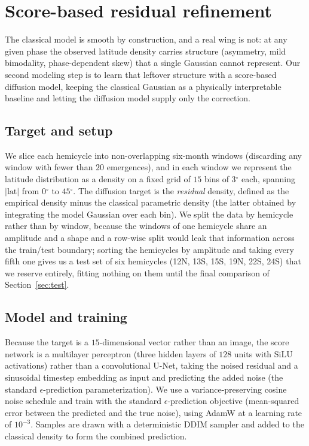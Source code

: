 \documentclass[twocolumn]{aastex631}
\newcommand{\degr}{\ensuremath{^{\circ}}}
\begin{document}
\section{Score-based residual refinement}
\label{sec:diffusion}

The classical model is smooth by construction, and a real wing is not: at any
given phase the observed latitude density carries structure (asymmetry, mild
bimodality, phase-dependent skew) that a single Gaussian cannot represent. Our
second modeling step is to learn that leftover structure with a score-based
diffusion model, keeping the classical Gaussian as a physically interpretable
baseline and letting the diffusion model supply only the correction.

\subsection{Target and setup}
\label{sec:target}

We slice each hemicycle into non-overlapping six-month windows (discarding any
window with fewer than $20$ emergences), and in each window we represent the
latitude distribution as a density on a fixed grid of $15$ bins of $3\degr$ each,
spanning $|\mathrm{lat}|$ from $0\degr$ to $45\degr$. The diffusion target is the
\emph{residual} density, defined as the empirical density minus the classical
parametric density (the latter obtained by integrating the model Gaussian over
each bin). We split the data by hemicycle rather than by window, because the
windows of one hemicycle share an amplitude and a shape and a row-wise split
would leak that information across the train/test boundary; sorting the
hemicycles by amplitude and taking every fifth one gives us a test set of six
hemicycles (12N, 13S, 15S, 19N, 22S, 24S) that we reserve entirely, fitting
nothing on them until the final comparison of Section~\ref{sec:test}.

\subsection{Model and training}
\label{sec:model}

Because the target is a $15$-dimensional vector rather than an image, the
score network is a multilayer perceptron (three hidden layers of $128$ units with
SiLU activations) rather than a convolutional U-Net, taking the noised residual
and a sinusoidal timestep embedding as input and predicting the added noise (the
standard $\epsilon$-prediction parameterization). We use a variance-preserving
cosine noise schedule \citep[$T=200$;][CIT]{NicholDhariwal2021}
and train with the standard $\epsilon$-prediction objective (mean-squared error
between the predicted and the true noise), using AdamW at a learning rate of
$10^{-3}$. Samples are drawn with a deterministic DDIM sampler and added to the
classical density to form the combined prediction.
\end{document}
